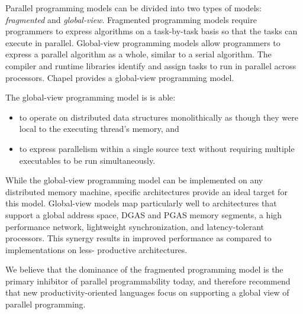 Parallel programming models can be divided into two types of models:
{\em fragmented} and {\em global-view}.  Fragmented programming models
require programmers to express algorithms on a task-by-task basis so that
the tasks can execute in parallel.  Global-view programming models
allow programmers to express a parallel algorithm as a whole, similar to
a serial algorithm.  The compiler and runtime libraries identify and assign
tasks to run in parallel across processors.  Chapel provides a global-view 
programming model.

The global-view programming model is is able:
\begin{itemize}
\item to operate on distributed data structures monolithically as 
though they were local to the executing thread's memory, and 
\item to express parallelism within a single source text without requiring 
multiple executables to be run simultaneously. 
\end{itemize}
While the global-view programming model can be implemented on any distributed memory 
machine, specific architectures provide an ideal target for this model.  
Global-view models map particularly well to architectures that 
support a global address space, DGAS and PGAS memory segments, a high performance 
network, lightweight synchronization, and latency-tolerant processors.  This 
synergy results in improved performance as compared to implementations on less-
productive architectures.

We believe that the dominance of the fragmented programming model is the primary
inhibitor of parallel programmability today, and therefore recommend that new
productivity-oriented languages focus on supporting a global view of parallel
programming.  




